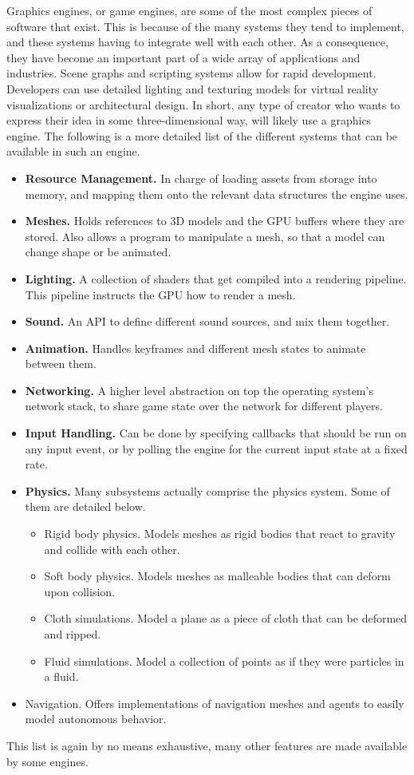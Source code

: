 Graphics engines,
or game engines,
are some of the most complex pieces of software that exist.
This is because of the many systems they tend to implement,
and these systems having to integrate well with each other.
As a consequence,
they have become an important part of a wide array of applications and industries.
Scene graphs and scripting systems allow for rapid development.
Developers can use detailed lighting and texturing models for virtual reality visualizations or architectural design.
In short,
any type of creator who wants to express their idea in some three-dimensional way,
will likely use a graphics engine.
The following is a more detailed list of the different systems that can be available in such an engine.

\begin{itemize}
\item \textbf{Resource Management.}
  In charge of loading assets from storage into memory,
  and mapping them onto the relevant data structures the engine uses.
\item \textbf{Meshes.}
  Holds references to 3D models and the GPU buffers where they are stored.
  Also allows a program to manipulate a mesh,
  so that a model can change shape or be animated.
\item \textbf{Lighting.}
  A collection of shaders that get compiled into a rendering pipeline.
  This pipeline instructs the GPU how to render a mesh.
\item \textbf{Sound.}
  An API to define different sound sources, and mix them together.
\item \textbf{Animation.}
  Handles keyframes and different mesh states to animate between them.
\item \textbf{Networking.}
  A higher level abstraction on top the operating system's network stack,
  to share game state over the network for different players.
\item \textbf{Input Handling.}
  Can be done by specifying callbacks that should be run on any input event,
  or by polling the engine for the current input state at a fixed rate.
\item \textbf{Physics.}
  Many subsystems actually comprise the physics system.
  Some of them are detailed below.
  \begin{itemize}
  \item {Rigid body physics.}
    Models meshes as rigid bodies that react to gravity and collide with each other.
  \item {Soft body physics.}
    Models meshes as malleable bodies that can deform upon collision.
  \item {Cloth simulations.}
    Model a plane as a piece of cloth that can be deformed and ripped.
  \item {Fluid simulations.}
    Model a collection of points as if they were particles in a fluid.
  \end{itemize}
\item {Navigation.}
  Offers implementations of navigation meshes and agents to easily model autonomous behavior.
\end{itemize}

This list is again by no means exhaustive,
many other features are made available by some engines.
